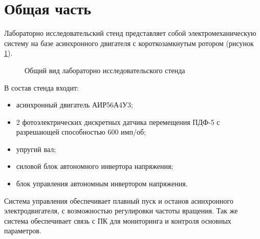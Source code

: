 \section{Общая часть}

        
        Лабораторно исследовательский стенд  представляет собой
        электромеханическую систему на базе асинхронного двигателя с
        короткозамкнутым ротором (рисунок \ref{fig:general-view}).

        \begin{figure}[h!]
            \caption{Общий вид лабораторно исследовательского стенда}
            \label{fig:general-view}
        \end{figure}
        
        В состав стенда входит:
        \begin{itemize}
            \item асинхронный двигатель АИР56А4У3;
            \item 2 фотоэлектрических дискретных датчика перемещения ПДФ-5 с
            разрешающей способностью  600 имп/об;
            \item упругий вал;
            \item силовой блок автономного инвертора напряжения;
            \item блок управления автономным инвертором напряжения.
        \end{itemize}

        Система управления обеспечивает плавный пуск и останов асинхронного
        электродвигателя, с возможностью регулировки частоты вращения. Так же
        система обеспечивает связь с ПК для мониторинга и контроля основных
        параметров.
          
